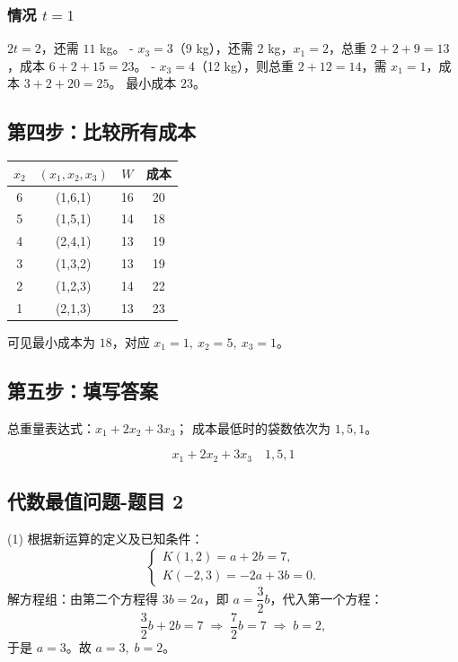 \subsubsection*{情况 \(t = 1\)}
\(2t = 2\)，还需 \(11\) kg。  
- \(x_3=3\)（9 kg），还需 \(2\) kg，\(x_1=2\)，总重 \(2+2+9=13\)，成本 \(6+2+15=23\)。  
- \(x_3=4\)（12 kg），则总重 \(2+12=14\)，需 \(x_1=1\)，成本 \(3+2+20=25\)。  
最小成本 \(23\)。

\subsection*{第四步：比较所有成本}
\begin{center}
\begin{tabular}{c|c|c|c}
\(x_2\) & \((x_1,x_2,x_3)\) & \(W\) & 成本 \\
\hline
6 & (1,6,1) & 16 & 20 \\
5 & (1,5,1) & 14 & 18 \\
4 & (2,4,1) & 13 & 19 \\
3 & (1,3,2) & 13 & 19 \\
2 & (1,2,3) & 14 & 22 \\
1 & (2,1,3) & 13 & 23 \\
\end{tabular}
\end{center}
可见最小成本为 \(18\)，对应 \(x_1=1,\ x_2=5,\ x_3=1\)。

\subsection*{第五步：填写答案}
总重量表达式：\(x_1 + 2x_2 + 3x_3\)；  
成本最低时的袋数依次为 \(1, 5, 1\)。

\[
\boxed{x_1+2x_2+3x_3}\quad\boxed{1,5,1}
\]


\subsection{代数最值问题-题目 2}

\label{代数最值问题-题目 2}  %


(1) 根据新运算的定义及已知条件：
\[
\begin{cases}
K(1,2)=a+2b=7,\\[2mm]
K(-2,3)=-2a+3b=0.
\end{cases}
\]
解方程组：由第二个方程得 \(3b=2a\)，即 \(a=\dfrac{3}{2}b\)，代入第一个方程：
\[
\frac{3}{2}b+2b=7 \;\Longrightarrow\; \frac{7}{2}b=7 \;\Longrightarrow\; b=2,
\]
于是 \(a=3\)。故 \(a=3,\; b=2\)。

